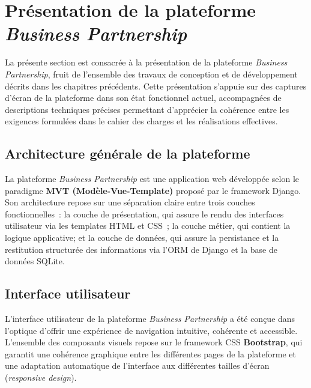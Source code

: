 \documentclass[12pt, a4paper, oneside]{report}
\begin{document}
	
\section{Présentation de la plateforme \textit{Business Partnership}}
\label{sec:presentation_plateforme}

La présente section est consacrée à la présentation de la plateforme
\textit{Business Partnership}, fruit de l'ensemble des travaux de
conception et de développement décrits dans les chapitres précédents. Cette présentation
s'appuie sur des captures d'écran de la plateforme dans son état
fonctionnel actuel, accompagnées de descriptions techniques précises
permettant d'apprécier la cohérence entre les exigences formulées
dans le cahier des charges et les réalisations effectives.

\subsection{Architecture générale de la plateforme}
\label{subsec:architecture_generale}

La plateforme \textit{Business Partnership} est une application web
développée selon le paradigme \textbf{MVT (Modèle-Vue-Template)}
proposé par le framework Django. Son architecture repose sur une
séparation claire entre trois couches fonctionnelles~: la couche
de présentation, qui assure le rendu des interfaces utilisateur via
les templates HTML et CSS~; la couche métier, qui contient la logique
applicative;
et la couche de données, qui assure la persistance et la restitution
structurée des informations via l'ORM de Django et la base de données
SQLite.

\subsection{Interface utilisateur}
\label{subsec:interface_utilisateur}

L'interface utilisateur de la plateforme \textit{Business Partnership}
a été conçue dans l'optique d'offrir une expérience de navigation intuitive, cohérente
et accessible. L'ensemble des
composants visuels repose sur le framework CSS \textbf{Bootstrap},
qui garantit une cohérence graphique entre les différentes pages
de la plateforme et une adaptation automatique de l'interface
aux différentes tailles d'écran (\textit{responsive design}).
\end{document}
